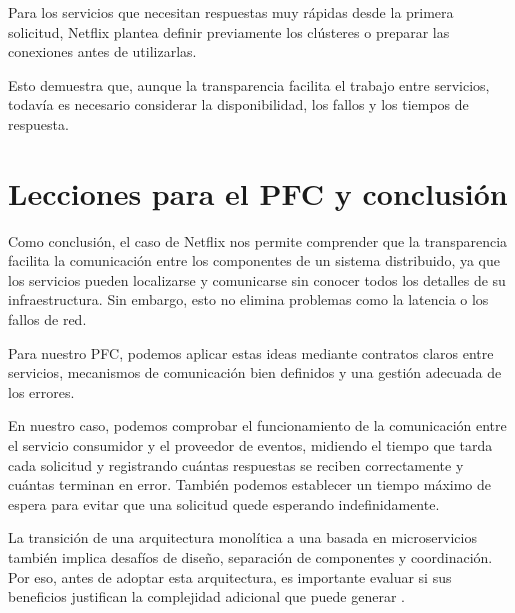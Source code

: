 Para los servicios que necesitan respuestas muy rápidas desde la primera solicitud, Netflix plantea definir previamente los clústeres o preparar las conexiones antes de utilizarlas.

Esto demuestra que, aunque la transparencia facilita el trabajo entre servicios, todavía es necesario considerar la disponibilidad, los fallos y los tiempos de respuesta.

\parencite{vroom2023mesh}


\section{Lecciones para el PFC y conclusión}

Como conclusión, el caso de Netflix nos permite comprender que la transparencia facilita la comunicación entre los componentes de un sistema distribuido, ya que los servicios pueden localizarse y comunicarse sin conocer todos los detalles de su infraestructura. Sin embargo, esto no elimina problemas como la latencia o los fallos de red.

Para nuestro PFC, podemos aplicar estas ideas mediante contratos claros entre servicios, mecanismos de comunicación bien definidos y una gestión adecuada de los errores.

En nuestro caso, podemos comprobar el funcionamiento de la comunicación entre el servicio consumidor y el proveedor de eventos, midiendo el tiempo que tarda cada solicitud y registrando cuántas respuestas se reciben correctamente y cuántas terminan en error. También podemos establecer un tiempo máximo de espera para evitar que una solicitud quede esperando indefinidamente.

La transición de una arquitectura monolítica a una basada en microservicios también implica desafíos de diseño, separación de componentes y coordinación. Por eso, antes de adoptar esta arquitectura, es importante evaluar si sus beneficios justifican la complejidad adicional que puede generar \parencite{abgaz2023decomposition}.
